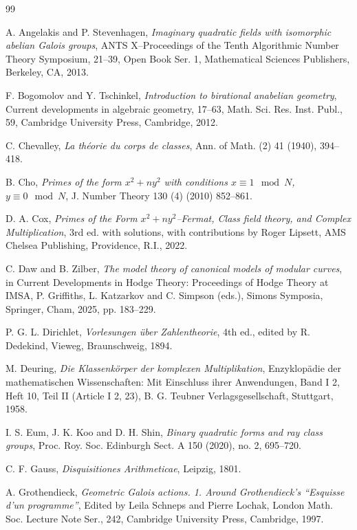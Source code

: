 \documentclass[reqno,11pt]{article}
\theoremstyle{plain} %
\theoremstyle{definition} %
\begin{document}

\begin{thebibliography}{99}

A. Angelakis and P. Stevenhagen, 
\textit{Imaginary quadratic fields with isomorphic abelian Galois groups},
ANTS X--Proceedings of the Tenth Algorithmic Number Theory Symposium, 21--39,
Open Book Ser. 1, Mathematical Sciences Publishers, Berkeley, CA, 2013.

 F. Bogomolov and Y. Tschinkel, 
\textit{Introduction to birational anabelian geometry}, Current developments in algebraic geometry, 17--63,
Math. Sci. Res. Inst. Publ., 59,  Cambridge University Press, Cambridge, 2012.

 C. Chevalley, 
\textit{La th\'{e}orie du corps de classes}, Ann. of Math. (2) 41 (1940), 394--418.

 B. Cho, 
\textit{Primes of the form $x^2+ny^2$ with conditions 
$x\equiv1\mod N$, $y\equiv0\mod N$}, J. Number Theory 130 (4) (2010) 852--861.

 D. A. Cox, \textit{Primes of the Form $x^2+ny^2$--Fermat, Class field theory, and Complex Multiplication},
3rd ed. with solutions, with contributions by Roger Lipsett,
AMS Chelsea Publishing, Providence, R.I., 2022.

 C. Daw and B. Zilber, 
\textit{The model theory of canonical models of modular curves},
in Current Developments in Hodge Theory: Proceedings of Hodge Theory at IMSA,
P. Griffiths, L. Katzarkov and C. Simpson (eds.), Simons Symposia, Springer, Cham, 2025, pp. 183--229.

 P. G. L. Dirichlet, \textit{Vorlesungen \"{u}ber Zahlentheorie},
4th ed., edited by R. Dedekind, Vieweg, Braunschweig, 1894.

 M. Deuring, \textit{Die Klassenk\"{o}rper der komplexen Multiplikation},
Enzyklop\"{a}die der mathematischen Wissenschaften:
Mit Einschluss ihrer Anwendungen,
Band I 2, Heft 10, Teil II (Article I 2, 23), B. G.
Teubner Verlagsgesellschaft, Stuttgart, 1958.

 I. S. Eum, J. K. Koo and D. H. Shin,
\textit{Binary quadratic forms and ray class groups},
Proc. Roy. Soc. Edinburgh Sect. A 150 (2020), no. 2, 695--720.

 C. F. Gauss, \textit{Disquisitiones Arithmeticae}, Leipzig, 1801.

 A. Grothendieck, 
\textit{Geometric Galois actions. 1.
Around Grothendieck's ``Esquisse d'un programme''}, Edited by Leila Schneps and Pierre Lochak,
London Math. Soc. Lecture Note Ser., 242, Cambridge University Press, Cambridge, 1997.


\end{thebibliography}
\end{document}
